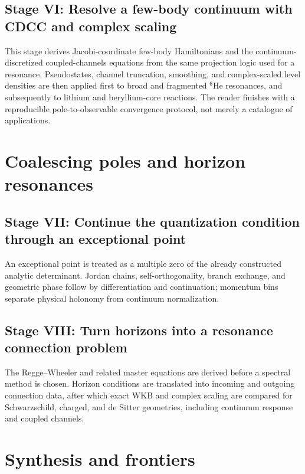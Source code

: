 \documentclass[11pt,openany]{book}
\theoremstyle{definition}
\newcommand{\learningstage}[3]{%
  \chapter{Stage #1: #2}%
  \begin{readercontract}#3\end{readercontract}%
}
\begin{document}
\learningstage{VI}{Resolve a few-body continuum with CDCC and complex scaling}{
This stage derives Jacobi-coordinate few-body Hamiltonians and the
continuum-discretized coupled-channels equations from the same projection
logic used for a resonance.  Pseudostates, channel truncation, smoothing, and
complex-scaled level densities are then applied first to broad and fragmented
$^6$He resonances, and subsequently to lithium and beryllium-core reactions.
The reader finishes with a reproducible pole-to-observable convergence
protocol, not merely a catalogue of applications.}






\part{Coalescing poles and horizon resonances}

\learningstage{VII}{Continue the quantization condition through an exceptional point}{
An exceptional point is treated as a multiple zero of the already
constructed analytic determinant.  Jordan chains, self-orthogonality,
branch exchange, and geometric phase follow by differentiation and
continuation; momentum bins separate physical holonomy from continuum
normalization.}






\learningstage{VIII}{Turn horizons into a resonance connection problem}{
The Regge--Wheeler and related master equations are derived before a spectral
method is chosen.  Horizon conditions are translated into incoming and
outgoing connection data, after which exact WKB and complex scaling are
compared for Schwarzschild, charged, and de Sitter geometries, including
continuum response and coupled channels.}








\part{Synthesis and frontiers}
\end{document}
